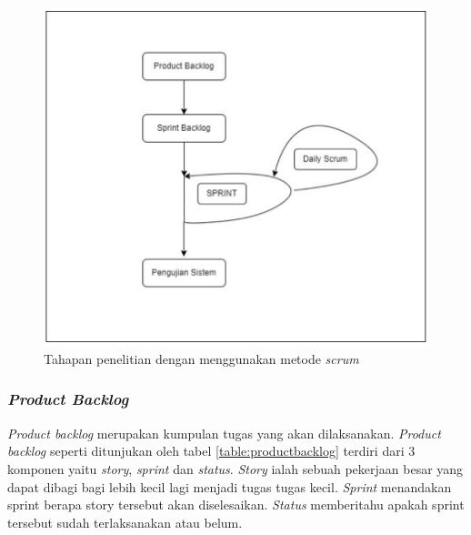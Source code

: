 \documentclass[
	a4paper, %
	10pt, %
	unnumberedsections, %
	twoside, %
]{LTJournalArticle}
\begin{document}
\begin{figure}[H]
	\includegraphics[width=\linewidth]{desain-penelitian.png}
	\caption{Tahapan penelitian dengan menggunakan metode \textit{scrum}}
\end{figure}

\subsubsection{\textit{Product Backlog}}
\textit{Product backlog} merupakan kumpulan tugas yang akan dilaksanakan. \textit{Product backlog} seperti ditunjukan oleh tabel \ref{table:productbacklog} terdiri dari 3 komponen yaitu \textit{story}, \textit{sprint} dan \textit{status}. \textit{Story} ialah sebuah pekerjaan besar yang dapat dibagi bagi lebih kecil lagi menjadi tugas tugas kecil. \textit{Sprint} menandakan sprint berapa story tersebut akan diselesaikan. \textit{Status} memberitahu apakah sprint tersebut sudah terlaksanakan atau belum.
\end{document}
